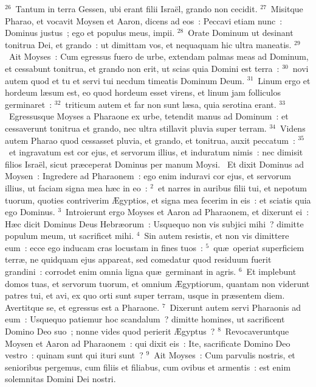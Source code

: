 ${}^{26}$~Tantum in terra Gessen, ubi erant filii Isra\"el, grando non cecidit.
${}^{27}$~Misitque Pharao, et vocavit Moysen et Aaron, dicens ad eos~: Peccavi etiam nunc~: Dominus justus~; ego et populus meus, impii.
${}^{28}$~Orate Dominum ut desinant tonitrua Dei, et grando~: ut dimittam vos, et nequaquam hic ultra maneatis.
${}^{29}$~Ait Moyses~: Cum egressus fuero de urbe, extendam palmas meas ad Dominum, et cessabunt tonitrua, et grando non erit, ut scias quia Domini est terra~:
${}^{30}$~novi autem quod et tu et servi tui necdum timeatis Dominum Deum.
${}^{31}$~Linum ergo et hordeum l\ae sum est, eo quod hordeum esset virens, et linum jam folliculos germinaret~:
${}^{32}$~triticum autem et far non sunt l\ae sa, quia serotina erant.
${}^{33}$~Egressusque Moyses a Pharaone ex urbe, tetendit manus ad Dominum~: et cessaverunt tonitrua et grando, nec ultra stillavit pluvia super terram.
${}^{34}$~Videns autem Pharao quod cessasset pluvia, et grando, et tonitrua, auxit peccatum~:
${}^{35}$~et ingravatum est cor ejus, et servorum illius, et induratum nimis~: nec dimisit filios Isra\"el, sicut pr\ae ceperat Dominus per manum Moysi.
~\lettrine[lines=10,image=true,loversize=0.05,lraise=-0.03]{E}{}t dixit Dominus ad Moysen~: Ingredere ad Pharaonem~: ego enim induravi cor ejus, et servorum illius, ut faciam signa mea h\ae c in eo~:
${}^{2}$~et narres in auribus filii tui, et nepotum tuorum, quoties contriverim \AE gyptios, et signa mea fecerim in eis~: et sciatis quia ego Dominus.
${}^{3}$~Introierunt ergo Moyses et Aaron ad Pharaonem, et dixerunt ei~: H\ae c dicit Dominus Deus Hebr\ae orum~: Usquequo non vis subjici mihi~? dimitte populum meum, ut sacrificet mihi.
${}^{4}$~Sin autem resistis, et non vis dimittere eum~: ecce ego inducam cras locustam in fines tuos~:
${}^{5}$~qu\ae\ operiat superficiem terr\ae , ne quidquam ejus appareat, sed comedatur quod residuum fuerit grandini~: corrodet enim omnia ligna qu\ae\ germinant in agris.
${}^{6}$~Et implebunt domos tuas, et servorum tuorum, et omnium \AE gyptiorum, quantam non viderunt patres tui, et avi, ex quo orti sunt super terram, usque in pr\ae sentem diem. Avertitque se, et egressus est a Pharaone.
${}^{7}$~Dixerunt autem servi Pharaonis ad eum~: Usquequo patiemur hoc scandalum~? dimitte homines, ut sacrificent Domino Deo suo~; nonne vides quod perierit \AE gyptus~?
${}^{8}$~Revocaveruntque Moysen et Aaron ad Pharaonem~: qui dixit eis~: Ite, sacrificate Domino Deo vestro~: quinam sunt qui ituri sunt~?
${}^{9}$~Ait Moyses~: Cum parvulis nostris, et senioribus pergemus, cum filiis et filiabus, cum ovibus et armentis~: est enim solemnitas Domini Dei nostri.
